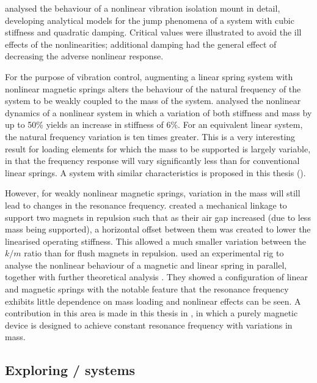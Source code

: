 \documentclass[11pt,a4paper]{memoir}
\begin{document}
\textcite{jazar2006} analysed the behaviour of a nonlinear vibration isolation mount in detail, developing analytical models for the jump phenomena of a system with cubic stiffness and quadratic damping.
Critical values were illustrated to avoid the ill effects of the nonlinearities; additional damping had the general effect of decreasing the adverse nonlinear response.

For the purpose of vibration control, augmenting a linear spring system with nonlinear magnetic springs alters the behaviour of the natural frequency of the system to be weakly coupled to the mass of the system.
\textcite{dangola2006} analysed the nonlinear dynamics of a nonlinear system in which a variation of both stiffness and mass by up to 50\% yields an increase in stiffness of 6\%.
For an equivalent linear system, the natural frequency variation is ten times greater.
This is a very interesting result for loading elements for which the mass to be supported is largely variable, in that the frequency response will vary significantly less than for conventional linear springs.
A system with similar characteristics is proposed in this thesis ().

However, for weakly nonlinear magnetic springs, variation in the mass will still lead to changes in the resonance frequency.
\textcite{todaka2001-ietm} created a mechanical linkage to support two magnets in repulsion such that as their air gap increased (due to less mass being supported), a horizontal offset between them was created to lower the linearised operating stiffness.
This allowed a much smaller variation between the $k/m$ ratio than for flush magnets in repulsion.
\textcite{bonisoli2007-mssp} used an experimental rig to analyse the nonlinear behaviour of a magnetic and linear spring in parallel, together with further theoretical analysis \cite{bonisoli2007-mrc}.
They showed a configuration of linear and magnetic springs with the notable feature that the resonance frequency exhibits little dependence on mass loading and nonlinear effects can be seen.
A contribution in this area is made in this thesis in , in which a purely magnetic device is designed to achieve constant resonance frequency with variations in mass.




\subsection{Exploring \qzs/ systems}
\end{document}
